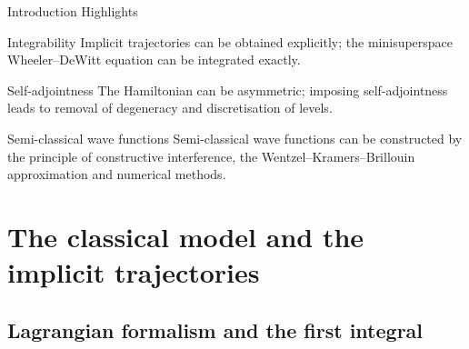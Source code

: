 \documentclass[8pt]{beamer}
\begin{document}
\begin{frame}%
{Introduction}%
{Highlights}
\begin{block}{Integrability}
Implicit trajectories can be obtained explicitly;
the minisuperspace Wheeler--DeWitt equation can be integrated exactly.
\end{block}

\begin{block}{Self-adjointness}
The Hamiltonian can be asymmetric;
imposing self-adjointness leads to removal of degeneracy and discretisation
of levels.
\end{block}

\begin{block}{Semi-classical wave functions}
Semi-classical wave functions can be constructed by the principle of
constructive interference, the Wentzel--Kramers--Brillouin approximation and
numerical methods.
\end{block}

\end{frame}

\section{The classical model and the implicit trajectories}

\subsection{Lagrangian formalism and the first integral}
\end{document}
